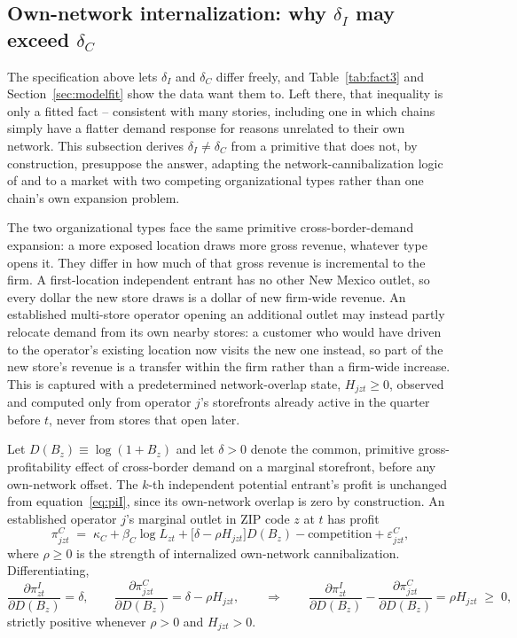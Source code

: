 \documentclass[english,12pt]{article}
\begin{document}
\subsection{Own-network internalization: why $\delta_I$ may exceed $\delta_C$}
\label{sec:cannibalization}

The specification above lets $\delta_I$ and $\delta_C$ differ freely, and Table~\ref{tab:fact3} and Section~\ref{sec:modelfit} show the data want them to. Left there, that inequality is only a fitted fact -- consistent with many stories, including one in which chains simply have a flatter demand response for reasons unrelated to their own network. This subsection derives $\delta_I \neq \delta_C$ from a primitive that does not, by construction, presuppose the answer, adapting the network-cannibalization logic of \citet{Nishida2008} and \citet{Holmes2011} to a market with two competing organizational types rather than one chain's own expansion problem.

The two organizational types face the same primitive cross-border-demand expansion: a more exposed location draws more gross revenue, whatever type opens it. They differ in how much of that gross revenue is incremental to the firm. A first-location independent entrant has no other New Mexico outlet, so every dollar the new store draws is a dollar of new firm-wide revenue. An established multi-store operator opening an additional outlet may instead partly relocate demand from its own nearby stores: a customer who would have driven to the operator's existing location now visits the new one instead, so part of the new store's revenue is a transfer within the firm rather than a firm-wide increase. This is captured with a predetermined network-overlap state, $H_{jzt}\ge 0$, observed and computed only from operator $j$'s storefronts already active in the quarter before $t$, never from stores that open later.

Let $D(B_z)\equiv\log(1+B_z)$ and let $\delta>0$ denote the common, primitive gross-profitability effect of cross-border demand on a marginal storefront, before any own-network offset. The $k$-th independent potential entrant's profit is unchanged from equation~\eqref{eq:piI}, since its own-network overlap is zero by construction. An established operator $j$'s marginal outlet in ZIP code $z$ at $t$ has profit
\begin{equation}
\pi^C_{jzt} \;=\; \kappa_C + \beta_C\log L_{zt} + \big[\delta - \rho H_{jzt}\big]D(B_z) - \text{competition} + \varepsilon^C_{jzt}, \label{eq:piC_micro}
\end{equation}
where $\rho\ge 0$ is the strength of internalized own-network cannibalization. Differentiating,
\[
\frac{\partial \pi^I_{zt}}{\partial D(B_z)} = \delta, \qquad \frac{\partial \pi^C_{jzt}}{\partial D(B_z)} = \delta - \rho H_{jzt}, \qquad \Longrightarrow \qquad \frac{\partial \pi^I_{zt}}{\partial D(B_z)} - \frac{\partial \pi^C_{jzt}}{\partial D(B_z)} = \rho H_{jzt} \;\ge\; 0,
\]
strictly positive whenever $\rho>0$ and $H_{jzt}>0$.
\end{document}
